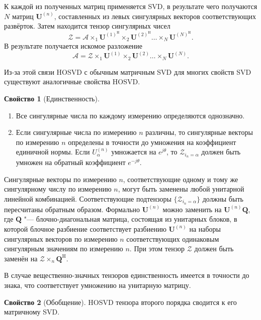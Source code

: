 \documentclass[specialist,
    substylefile = spbu_report.rtx,
    subf,href,colorlinks=true, 12pt]{disser}
\theoremstyle{plain}
\theoremstyle{definition}
\newtheorem{property}{Свойство}[section]
\theoremstyle{remark}
\begin{document}
    К каждой из полученных матриц применяется SVD, в результате чего получаются $N$ матриц $\mathbf{U}^{(n)}$,
    составленных из левых сингулярных векторов соответствующих развёрток.
    Затем находится тензор сингулярных чисел
    \[\mathcal{Z}=\mathcal{A}\times_1 \mathbf{U}^{(1)^\mathrm{H}}\times_2 \mathbf{U}^{(2)^\mathrm{H}}\ldots \times_N
    \mathbf{U}^{(N)^\mathrm{H}}.\]
    В результате получается искомое разложение
    \[\mathcal{A} = \mathcal{Z}\times_1 \mathbf{U}^{(1)}\times_2 \mathbf{U}^{(2)}\ldots \times_N \mathbf{U}^{(N)}.\]

    Из-за этой связи HOSVD с обычным матричным SVD для многих свойств SVD существуют аналогичные свойства HOSVD\@.
    \begin{property}[Единственность]
        \leavevmode
        \begin{enumerate}
            \item Все сингулярные числа по каждому измерению определяются однозначно.
            \item Если сингулярные числа по измерению $n$ различны, то сингулярные векторы по измерению $n$ определены
            в точности до умножения на коэффициент единичной нормы.
            Если $U_\alpha^{(n)}$ умножается на $e^{j\theta}$, то $\mathcal{Z}_{i_n=\alpha}$ должен быть умножен на обратный
            коэффициент $e^{-j\theta}$.
        \end{enumerate}
        Сингулярные векторы по измерению $n$, соответствующие одному и тому же сингулярному числу по измерению $n$,
        могут быть заменены любой унитарной линейной комбинацией.
        Соответствующие подтензоры $\{\mathcal{Z}_{i_n=\alpha}\}$ должны быть пересчитаны обратным образом.
        Формально $\mathbf{U}^{(n)}$ можно заменить на $\mathbf{U}^{(n)}\mathbf{Q}$, где $\mathbf{Q}$ "--- блочно-диагональная
        матрица, состоящая из унитарных блоков, в которой блочное разбиение соответствует разбиению $\mathbf{U}^{(n)}$
        на наборы сингулярных векторов по измерению $n$ соответствующих одинаковым сингулярным значениям по измерению $n$.
        При этом тензор $\mathcal{Z}$ должен быть заменён на $\mathcal{Z}\times_{n} \mathbf{Q}^{\mathrm{H}}$.

        В случае вещественно-значных тензоров единственность имеется в точности до знака, что соответствует
        умножению на унитарную матрицу.
    \end{property}

    \begin{property}[Обобщение]
        HOSVD тензора второго порядка сводится к его матричному SVD\@.
    \end{property}
\end{document}
